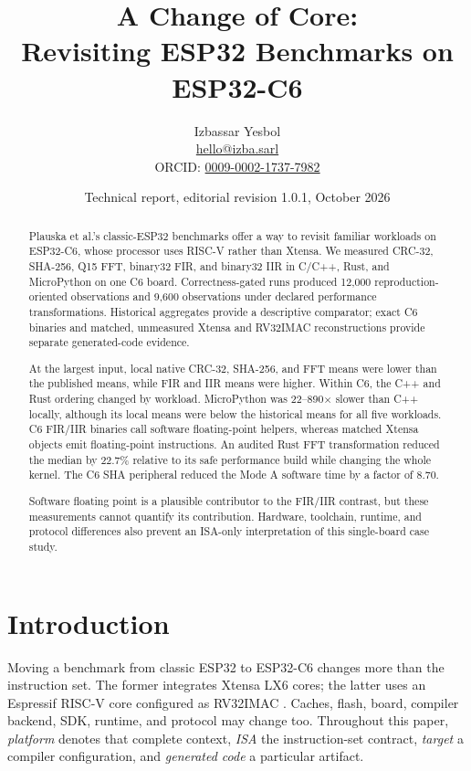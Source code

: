 \documentclass[10pt]{article}
\title{A Change of Core:\\Revisiting ESP32 Benchmarks on ESP32-C6}
\author{Izbassar Yesbol\\[-0.2em]\small\href{mailto:hello@izba.sarl}{hello@izba.sarl}\\\small ORCID: \href{https://orcid.org/0009-0002-1737-7982}{0009-0002-1737-7982}}
\date{Technical report, editorial revision 1.0.1, October 2026}
\begin{document}
\maketitle
\begin{abstract}
Plauska et al.'s classic-ESP32 benchmarks offer a way to revisit familiar workloads on ESP32-C6, whose processor uses RISC-V rather than Xtensa. We measured CRC-32, SHA-256, Q15 FFT, binary32 FIR, and binary32 IIR in C/C++, Rust, and MicroPython on one C6 board. Correctness-gated runs produced 12,000 reproduction-oriented observations and 9,600 observations under declared performance transformations. Historical aggregates provide a descriptive comparator; exact C6 binaries and matched, unmeasured Xtensa and RV32IMAC reconstructions provide separate generated-code evidence.

At the largest input, local native CRC-32, SHA-256, and FFT means were lower than the published means, while FIR and IIR means were higher. Within C6, the C++ and Rust ordering changed by workload. MicroPython was 22--890$\times$ slower than C++ locally, although its local means were below the historical means for all five workloads. C6 FIR/IIR binaries call software floating-point helpers, whereas matched Xtensa objects emit floating-point instructions. An audited Rust FFT transformation reduced the median by 22.7\% relative to its safe performance build while changing the whole kernel. The C6 SHA peripheral reduced the Mode A software time by a factor of 8.70.

Software floating point is a plausible contributor to the FIR/IIR contrast, but these measurements cannot quantify its contribution. Hardware, toolchain, runtime, and protocol differences also prevent an ISA-only interpretation of this single-board case study.
\end{abstract}

\section{Introduction}
Moving a benchmark from classic ESP32 to ESP32-C6 changes more than the instruction set. The former integrates Xtensa LX6 cores; the latter uses an Espressif RISC-V core configured as RV32IMAC \citep{espressifESP32Datasheet,espressifESP32C6Datasheet}. Caches, flash, board, compiler backend, SDK, runtime, and protocol may change too. Throughout this paper, \emph{platform} denotes that complete context, \emph{ISA} the instruction-set contract, \emph{target} a compiler configuration, and \emph{generated code} a particular artifact.
\end{document}
